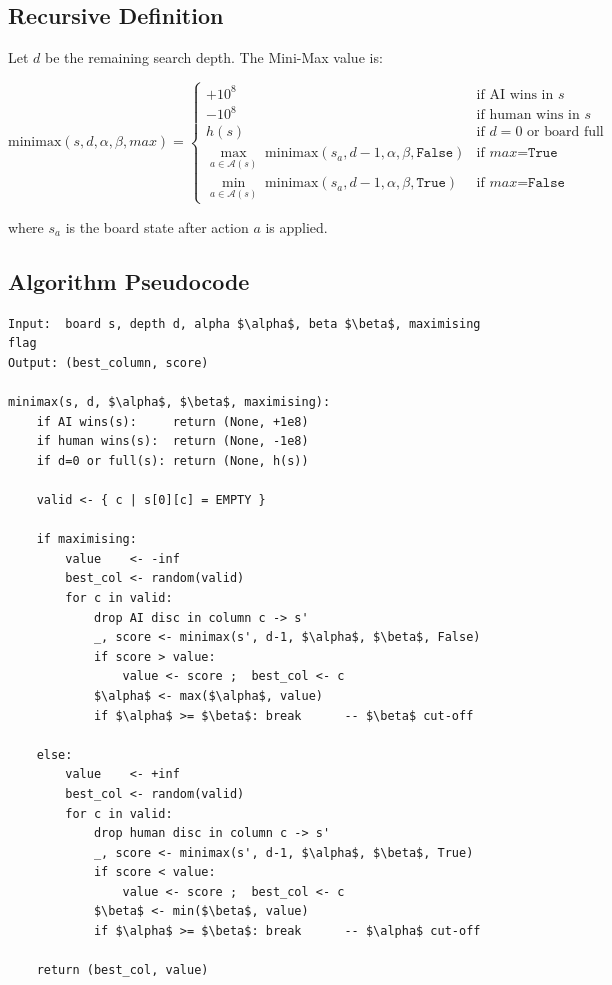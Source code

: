 \documentclass[12pt]{article}
\begin{document}
\subsection{Recursive Definition}

Let $d$ be the remaining search depth.  The Mini-Max value is:

\begin{equation}
\text{minimax}(s, d, \alpha, \beta, \textit{max}) =
\begin{cases}
+10^8 & \text{if AI wins in } s \\
-10^8 & \text{if human wins in } s \\
h(s)  & \text{if } d = 0 \text{ or board full} \\[4pt]
\displaystyle\max_{a \in \mathcal{A}(s)}\;\text{minimax}(s_a, d{-}1, \alpha, \beta, \texttt{False})
       & \text{if } \textit{max} = \texttt{True} \\[6pt]
\displaystyle\min_{a \in \mathcal{A}(s)}\;\text{minimax}(s_a, d{-}1, \alpha, \beta, \texttt{True})
       & \text{if } \textit{max} = \texttt{False}
\end{cases}
\end{equation}

where $s_a$ is the board state after action $a$ is applied.

\subsection{Algorithm Pseudocode}

\begin{lstlisting}[language={}, caption={Mini-Max with Alpha-Beta Pruning (pseudocode)}, mathescape=true]
Input:  board s, depth d, alpha $\alpha$, beta $\beta$, maximising flag
Output: (best_column, score)

minimax(s, d, $\alpha$, $\beta$, maximising):
    if AI wins(s):     return (None, +1e8)
    if human wins(s):  return (None, -1e8)
    if d=0 or full(s): return (None, h(s))

    valid <- { c | s[0][c] = EMPTY }

    if maximising:
        value    <- -inf
        best_col <- random(valid)
        for c in valid:
            drop AI disc in column c -> s'
            _, score <- minimax(s', d-1, $\alpha$, $\beta$, False)
            if score > value:
                value <- score ;  best_col <- c
            $\alpha$ <- max($\alpha$, value)
            if $\alpha$ >= $\beta$: break      -- $\beta$ cut-off

    else:
        value    <- +inf
        best_col <- random(valid)
        for c in valid:
            drop human disc in column c -> s'
            _, score <- minimax(s', d-1, $\alpha$, $\beta$, True)
            if score < value:
                value <- score ;  best_col <- c
            $\beta$ <- min($\beta$, value)
            if $\alpha$ >= $\beta$: break      -- $\alpha$ cut-off

    return (best_col, value)
\end{lstlisting}
\end{document}
